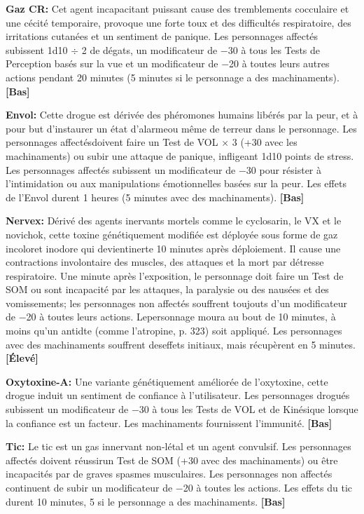 \textbf{Gaz CR:} Cet agent incapacitant puissant cause des tremblements cocculaire et une cécité temporaire, provoque une forte toux et des difficultés respiratoire, des irritations cutanées et un sentiment de panique. Les personnages affectés subissent 1d10 $\div$ 2 de dégats, un modificateur de $-$30 à tous les Tests de Perception basés sur la vue et un modificateur de $-$20 à toutes leurs autres actions pendant 20 minutes (5 minutes si le personnage a des machinaments). \textbf{[Bas]} 

\textbf{Envol:} Cette drogue est dérivée des phéromones humains libérés par la peur, et à pour but d'instaurer un état d'alarmeou même de terreur dans le personnage. Les personnages affectésdoivent faire un Test de VOL $\times$ 3 (+30 avec les machinaments) ou subir une attaque de panique, infligeant 1d10 points de stress. Les personnages affectés subissent un modificateur de $-$30 pour résister à l'intimidation ou aux manipulations émotionnelles basées sur la peur. Les effets de l'Envol durent 1 heures (5 minutes avec des machinaments). \textbf{[Bas]} 

\textbf{Nervex:} Dérivé des agents inervants mortels comme le cyclosarin, le VX et le novichok, cette toxine génétiquement modifiée est déployée sous forme de gaz incoloret inodore qui devientinerte 10 minutes après déploiement. Il cause une contractions involontaire des muscles, des attaques et la mort par détresse respiratoire. Une minute après l'exposition, le personnage doit faire un Test de SOM ou sont incapacité par les attaques, la paralysie ou des nausées et des vomissements; les personnages non affectés souffrent toujouts d'un modificateur de $-$20 à toutes leurs actions. Lepersonnage moura au bout de 10 minutes, à moins qu'un antidte (comme l'atropine, p. 323) soit appliqué. Les personnages avec des machinaments souffrent deseffets initiaux, mais récupèrent en 5 minutes. \textbf{[Élevé]} 

\textbf{Oxytoxine-A:} Une variante génétiquement améliorée de l'oxytoxine, cette drogue induit un sentiment de confiance à l'utilisateur. Les personnages drogués subissent un modificateur de $-$30 à tous les Tests de VOL et de Kinésique lorsque la confiance est un facteur. Les machinaments fournissent l'immunité. \textbf{[Bas]} 

\textbf{Tic:} Le tic est un gas innervant non-létal et un agent convulsif. Les personnages affectés doivent réussirun Test de SOM (+30 avec des machinaments) ou être incapacités par de graves spasmes musculaires. Les personnages non affectés continuent de subir un modificateur de $-$20 à toutes les actions. Les effets du tic durent 10 minutes, 5 si le personnage a des machinaments. \textbf{[Bas]} 



